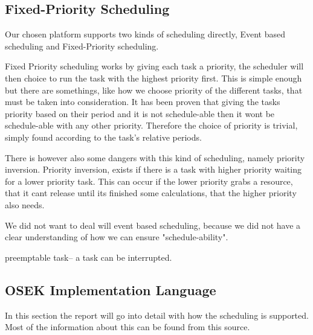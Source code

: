 







\subsection{\textbf{Fixed-Priority Scheduling}}\label{prioratySch}
Our chosen platform supports two kinds of scheduling directly, Event based scheduling and Fixed-Priority scheduling\cite{OILManual}.

Fixed Priority scheduling works by giving each task a priority, the scheduler will then choice to run the task with the highest priority first. This is simple enough but there are somethings, like how we choose priority of the different tasks,  that must be taken into consideration. It has been proven that giving the tasks priority based on their period and it is not schedule-able then it wont be schedule-able with any other priority. Therefore the choice of priority is trivial, simply found according to the task's relative periods.

There is however also some dangers with this kind of scheduling, namely priority inversion. Priority inversion, exists if there is a task with higher priority waiting for a lower priority task. This can occur if the lower priority grabs a resource, that it cant release until its finished some calculations, that the higher priority also needs. 

We did not want to deal will event based scheduling, because we did not have a clear understanding of how we can ensure "schedule-ability".

preemptable task-- a task can be interrupted.
\subsection{\textbf{OSEK Implementation Language}}
In this section the report will go into detail with how the scheduling is supported. Most of the information about this can be found from this source\cite{OILManual}.

